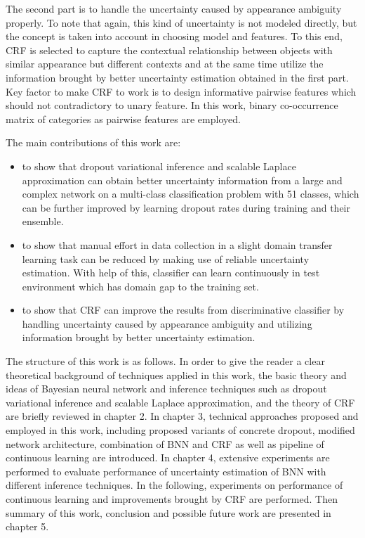 The second part is to handle the uncertainty caused by appearance ambiguity properly. To note that again, this kind of uncertainty is not modeled directly, but the concept is taken into account in choosing model and features. To this end, CRF is selected to capture the contextual relationship between objects with similar appearance but different contexts and at the same time utilize the information brought by better uncertainty estimation obtained in the first part. Key factor to make CRF to work is to design informative pairwise features which should not contradictory to unary feature. In this work, binary co-occurrence matrix of categories as pairwise features are employed.

The main contributions of this work are:
\begin{itemize}
	\item to show that dropout variational inference and scalable Laplace approximation can obtain better uncertainty information from a large and complex network on a multi-class classification problem with 51 classes, which can be further improved by learning dropout rates during training and their ensemble.
	\item to show that manual effort in data collection in a slight domain transfer learning task can be reduced by making use of reliable uncertainty estimation. With help of this, classifier can learn continuously in test environment which has domain gap to the training set.
	\item to show that CRF can improve the results from discriminative classifier by handling uncertainty caused by appearance ambiguity and utilizing information brought by better uncertainty estimation.
\end{itemize}

The structure of this work is as follows. In order to give the reader a clear theoretical background of techniques applied in this work, the basic theory and ideas of Bayesian neural network and inference techniques such as dropout variational inference and scalable Laplace approximation, and the theory of CRF are briefly reviewed in chapter 2. In chapter 3, technical approaches proposed and employed in this work, including proposed variants of concrete dropout, modified network architecture, combination of BNN and CRF as well as pipeline of continuous learning are introduced. In chapter 4, extensive experiments are performed to evaluate performance of uncertainty estimation of BNN with different inference techniques. In the following, experiments on performance of continuous learning and improvements brought by CRF are performed. Then summary of this work, conclusion and possible future work are presented in chapter 5.

